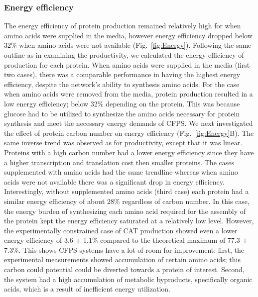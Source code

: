 \documentclass[journal=asbcd6,manuscript=article]{achemso}
\begin{document}
\subsubsection{Energy efficiency}
The energy efficiency of protein production remained relatively high for when amino acids were supplied in the media, however energy efficiency dropped below 32\% when amino acids were not available (Fig.~\ref{fig:Energy}).
Following the same outline as in examining the productivity, we calculated the energy efficiency of production for each protein.
When amino acids were supplied in the media (first two cases), there was a comparable performance in having the highest energy efficiency, despite the network's ability to synthesis amino acids.
For the case when amino acids were removed from the media, protein production resulted in a low energy efficiency; below 32\% depending on the protein. 
This was because glucose had to be utilized to synthesize the amino acids necessary for protein synthesis and meet the necessary energy demands of CFPS.
We next investigated the effect of protein carbon number on energy efficiency (Fig.~\ref{fig:Energy}B).
The same inverse trend was observed as for productivity, except that it was linear.
Proteins with a high carbon number had a lower energy efficiency since they have a higher transcription and translation cost then smaller proteins.
The cases supplemented with amino acids had the same trendline whereas when amino acids were not available there was a significant drop in energy efficiency.
Interestingly, without supplemented amino acids (third case) each protein had a similar energy efficiency of about 28\% regardless of carbon number.
In this case, the energy burden of synthesizing each amino acid required for the assembly of the protein kept the energy efficiency saturated at a relatively low level.
However, the experimentally constrained case of CAT production showed even a lower energy efficiency of 3.6 $\pm$ 1.1\% compared to the theoretical maximum of 77.3 $\pm$ 7.3\%.
This shows CFPS systems have a lot of room for improvement: first, the experimental measurements showed accumulation of certain amino acids; this carbon could potential could be diverted towards a protein of interest.
Second, the system had a high accumulation of metabolic byproducts, specifically organic acids, which is a result of inefficient energy utilization.
\end{document}
